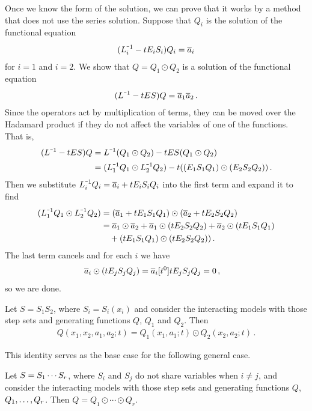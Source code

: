 \begin{exa} Once we know the form of the solution, we can prove that it works by a method that does not use the series solution. Suppose that $Q_i$ is the solution of the functional equation
\begin{align}
	(L_i^{\um 1} - t E_i S_i)Q_i = \ol a_i
\end{align}
for $i = 1$ and $i = 2$. We show that $Q = Q_1 \odot Q_2$ is a solution of the functional equation
\begin{align}
	(L^{\um 1} - t ES)Q = \ol a_1\ol a_2\,.
\end{align}
Since the operators act by multiplication of terms, they can be moved over the Hadamard product if they do not affect the variables of one of the functions. That is,
\begin{align}
	\begin{split}
		(L^{\um 1}-t ES)Q &= L^{\um 1} (Q_1\odot Q_2) - t ES(Q_1\odot Q_2)\\
		& = (L^{\um 1}_1Q_1\odot L^{\um 1}_2Q_2) - t((E_1S_1Q_1)\odot (E_2S_2Q_2))\,.
	\end{split}
\end{align}
Then we substitute $ L^{\um 1}_i Q_i = \ol a_i + t E_i S_i Q_i$ into the first term and expand it to find
\begin{align}
	\begin{split}
		 (L^{\um 1}_1Q_1\odot L^{\um 1}_2Q_2) &= (\ol a_1 + t E_1 S_1 Q_1)\odot(\ol a_2 + t E_2 S_2 Q_2)\\
		 & = \ol a_1\odot\ol a_2 + \ol a_1\odot (t E_2 S_2 Q_2) + \ol a_2\odot(t E_1 S_1 Q_1) \\
		 &\quad + (t E_1 S_1 Q_1)\odot(t E_2 S_2 Q_2))\,.
	\end{split}
\end{align}
The last term cancels and for each $i$ we have
\begin{align}
	\overline{a}_i\odot (t E_j S_j Q_j) &= \overline{a}_i [t^0]t E_j S_j Q_j = 0\,,
\end{align}
so we are done.
\end{exa}

\begin{lem} Let $S = S_1S_2$, where $S_i =S_i(x_i)$ and consider the \classic interacting models with those step sets and generating functions $Q$, $Q_1$ and $Q_2$. Then 
\begin{align}
	Q(x_1,x_2,a_1,a_2;t) = Q_1(x_1,a_1;t)\odot Q_2(x_2,a_2;t)\,.
\end{align}
\end{lem}
This identity serves as the base case for the following general case.
\begin{thm}Let $S = S_1\cdots S_r$, where $S_i$ and $S_j$ do not share variables when $i\neq j$, and consider the \classic interacting models with those step sets and generating functions $Q$, $Q_1,\ldots, Q_r$. Then $Q = Q_1 \odot \cdots \odot Q_r$.
\end{thm}

